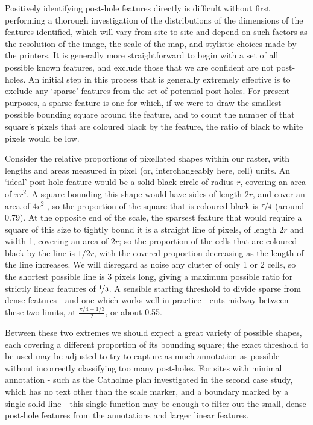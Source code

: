 \documentclass[../../ArchStats.tex]{subfiles}
\begin{document}
Positively identifying post-hole features directly is difficult without first performing a thorough investigation of the distributions of the dimensions of the features identified, which will vary from site to site and depend on such factors as the resolution of the image, the scale of the map, and stylistic choices made by the printers. It is generally more straightforward to begin with a set of all possible known features, and exclude those that we are confident are not post-holes. An initial step in this process that is generally extremely effective is to exclude any `sparse' features from the set of potential post-holes. For present purposes, a sparse feature is one for which, if we were to draw the smallest possible bounding square  around the feature, and to count the number of that square's pixels that are coloured black by the feature, the ratio of black to white pixels would be low.

Consider the relative proportions of pixellated shapes within our raster, with lengths and areas measured in pixel (or, interchangeably here, cell) units. An `ideal' post-hole feature would be a solid black circle of radius $r$,  covering an area of $\pi r^2$. A square bounding this shape would have sides of length $2r$, and cover an area of $4r^2$ , so the proportion of the square that is coloured black is $\nicefrac{\pi}{4}$ (around 0.79). At the opposite end of the scale, the sparsest feature that would require a square of this size to tightly bound it is a straight line of pixels, of length $2r$ and width 1, covering an area of $2r$; so the proportion of the cells that are coloured black by the line is $1/2r$, with the covered proportion decreasing as the length of the line increases. We will disregard as noise any cluster of only 1 or 2 cells, so the shortest possible line is 3 pixels long, giving a maximum possible ratio for strictly linear features of $\nicefrac{1}{3}$. A sensible starting threshold to divide sparse from dense features - and one which works well in practice - cuts midway between these two limits, at $\frac{\pi/4+1/3}{2}$, or about 0.55. 

Between these two extremes we should expect a great variety of possible shapes, each covering a different proportion of its bounding square; the exact threshold to be used may be adjusted to try to capture as much annotation as possible without incorrectly classifying too many post-holes. For sites with minimal annotation - such as the Catholme plan investigated in the second case study, which has no text other than the scale marker, and a boundary marked by a single solid line - this single function may be enough to filter out the small, dense post-hole features from the annotations and larger linear features.
\end{document}

